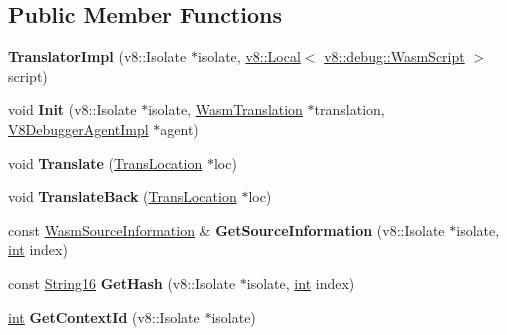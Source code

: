 \subsection*{Public Member Functions}
\begin{DoxyCompactItemize}
\item 
\mbox{\label{classv8__inspector_1_1WasmTranslation_1_1TranslatorImpl_a868bb9b4aa42e63351ee59ffebe774d9}} 
{\bfseries Translator\+Impl} (v8\+::\+Isolate $\ast$isolate, \mbox{\hyperlink{classv8_1_1Local}{v8\+::\+Local}}$<$ \mbox{\hyperlink{classv8_1_1debug_1_1WasmScript}{v8\+::debug\+::\+Wasm\+Script}} $>$ script)
\item 
\mbox{\label{classv8__inspector_1_1WasmTranslation_1_1TranslatorImpl_a85fe1d18dc679043b34339ebacb882ea}} 
void {\bfseries Init} (v8\+::\+Isolate $\ast$isolate, \mbox{\hyperlink{classv8__inspector_1_1WasmTranslation}{Wasm\+Translation}} $\ast$translation, \mbox{\hyperlink{classv8__inspector_1_1V8DebuggerAgentImpl}{V8\+Debugger\+Agent\+Impl}} $\ast$agent)
\item 
\mbox{\label{classv8__inspector_1_1WasmTranslation_1_1TranslatorImpl_aded67c83b0d61302391135dcc6fff40a}} 
void {\bfseries Translate} (\mbox{\hyperlink{structv8__inspector_1_1WasmTranslation_1_1TranslatorImpl_1_1TransLocation}{Trans\+Location}} $\ast$loc)
\item 
\mbox{\label{classv8__inspector_1_1WasmTranslation_1_1TranslatorImpl_a0b26c3c17ed4f279a6eecc7b5dee5bcb}} 
void {\bfseries Translate\+Back} (\mbox{\hyperlink{structv8__inspector_1_1WasmTranslation_1_1TranslatorImpl_1_1TransLocation}{Trans\+Location}} $\ast$loc)
\item 
\mbox{\label{classv8__inspector_1_1WasmTranslation_1_1TranslatorImpl_a6eaf034aa5273d25dc586b955a882540}} 
const \mbox{\hyperlink{structv8__inspector_1_1WasmSourceInformation}{Wasm\+Source\+Information}} \& {\bfseries Get\+Source\+Information} (v8\+::\+Isolate $\ast$isolate, \mbox{\hyperlink{classint}{int}} index)
\item 
\mbox{\label{classv8__inspector_1_1WasmTranslation_1_1TranslatorImpl_a5cb1e0289c41c0d21c5a38f2013ff1e9}} 
const \mbox{\hyperlink{classv8__inspector_1_1String16}{String16}} {\bfseries Get\+Hash} (v8\+::\+Isolate $\ast$isolate, \mbox{\hyperlink{classint}{int}} index)
\item 
\mbox{\label{classv8__inspector_1_1WasmTranslation_1_1TranslatorImpl_a27e174e12917438de7f4c81995f7b160}} 
\mbox{\hyperlink{classint}{int}} {\bfseries Get\+Context\+Id} (v8\+::\+Isolate $\ast$isolate)
\end{DoxyCompactItemize}
